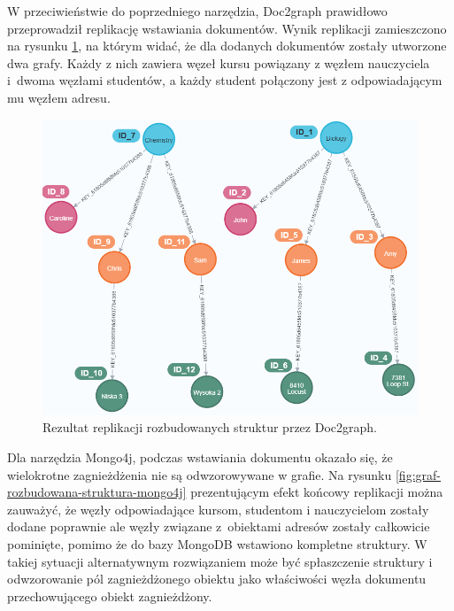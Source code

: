 \documentclass[a4paper,twoside,12pt]{book}
\begin{document}
W przeciwieństwie do poprzedniego narzędzia, Doc2graph prawidłowo przeprowadził replikację wstawiania dokumentów. Wynik replikacji zamieszczono na rysunku \ref{fig:graf-rozbudowana-struktura-doc2graph}, na którym widać, że dla dodanych dokumentów zostały utworzone dwa grafy. Każdy z nich zawiera węzeł kursu powiązany z węzłem nauczyciela i~dwoma węzłami studentów, a każdy student połączony jest z odpowiadającym mu węzłem adresu. 

\begin{figure}[!h]
\centering
\includegraphics[width=14cm]{images/rozbudowana_struktura_doc2graph.png}
\caption{Rezultat replikacji rozbudowanych struktur przez Doc2graph.}
\label{fig:graf-rozbudowana-struktura-doc2graph}
\end{figure}

Dla narzędzia Mongo4j, podczas wstawiania dokumentu okazało się, że wielokrotne zagnieżdżenia nie są odwzorowywane w grafie. Na rysunku \ref{fig:graf-rozbudowana-struktura-mongo4j} prezentującym efekt końcowy replikacji można zauważyć, że węzły odpowiadające kursom, studentom i nauczycielom zostały dodane poprawnie ale węzły związane z~obiektami adresów zostały całkowicie pominięte, pomimo że do bazy MongoDB wstawiono kompletne struktury. W takiej sytuacji alternatywnym rozwiązaniem może być spłaszczenie struktury i odwzorowanie pól zagnieżdżonego obiektu jako właściwości węzła dokumentu przechowującego obiekt zagnieżdżony.
\end{document}
